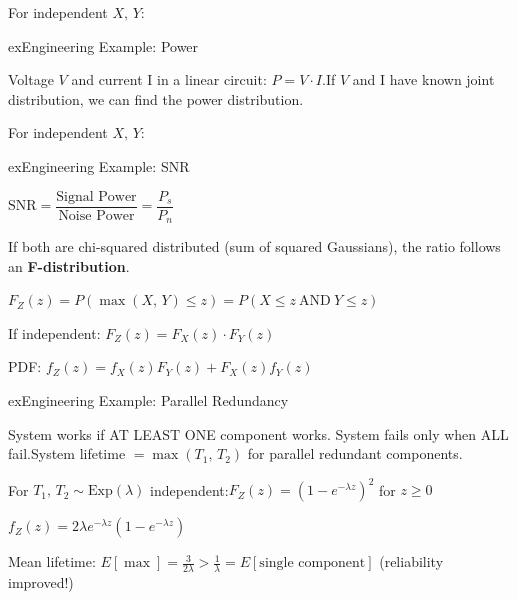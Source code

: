 
For independent $X,\, Y$:

\begin{PSbox}[unbreakable]{ex}{Engineering Example: Power}

Voltage $V$ and current I in a linear circuit: $P = V \cdot I$.\PSbr{}If $V$ and I have known joint distribution, we can find the power distribution.

\end{PSbox}


For independent $X,\, Y$:

\begin{PSbox}[unbreakable]{ex}{Engineering Example: SNR}

$\mathrm{SNR} = \dfrac{\text{Signal Power}}{\text{Noise Power}} = \dfrac{P_s}{P_n}$

If both are chi-squared distributed (sum of squared Gaussians), the ratio follows an \textbf{F-distribution}.

\end{PSbox}



$F_{Z}(z) = P(\max (X,\,Y) \le z) = P(X \le z\ \text{AND}\ Y \le z)$

If independent: $F_{Z}(z) = F_{X}(z) \cdot F_{Y}(z)$

PDF: $f_{Z}(z) = f_{X}(z)F_{Y}(z) + F_{X}(z)f_{Y}(z)$

\begin{PSbox}[unbreakable]{ex}{Engineering Example: Parallel Redundancy}

System works if AT LEAST ONE component works. System fails only when ALL fail.\PSbr{}System lifetime $= \max (T_{1},\, T_{2})$ for parallel redundant components.

For $T_{1},\, T_{2} \sim \mathrm{Exp}(\lambda)$ independent:\PSbr{}$F_{Z}(z) = (1 - e^{-\lambda z})^{2}$ for $z \ge 0$

$f_{Z}(z) = 2\lambda e^{-\lambda z}(1 - e^{-\lambda z})$

Mean lifetime: $E[\max] = \frac{3}{2\lambda} > \frac{1}{\lambda} = E[\text{single component}]$ (reliability improved!)

\end{PSbox}

